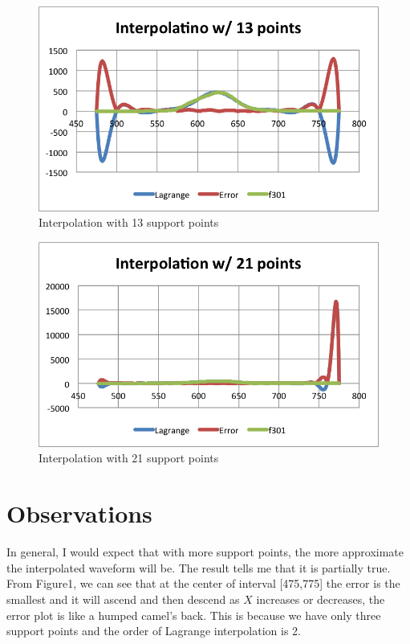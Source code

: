\documentclass[12pt,a4paper]{article}
\begin{document}
\begin{figure}[h!]
  \centering
      \includegraphics[width=1\textwidth]{./13.png}
  \caption{Interpolation with 13 support points}
\end{figure}
\begin{figure}[h!]
  \centering
      \includegraphics[width=1\textwidth]{./21.png}
  \caption{Interpolation with 21 support points}
\end{figure}


\section{Observations}
In general, I would expect that with more support points, the more approximate the interpolated waveform will be. The result tells me that it is partially true.
From Figure1, we can see that at the center of interval [475,775] the error is the smallest and it will ascend and then descend as $X$ increases or decreases, the error plot is like a humped camel's back. This is because we have only three support points and the order of Lagrange interpolation is 2.
\end{document}
